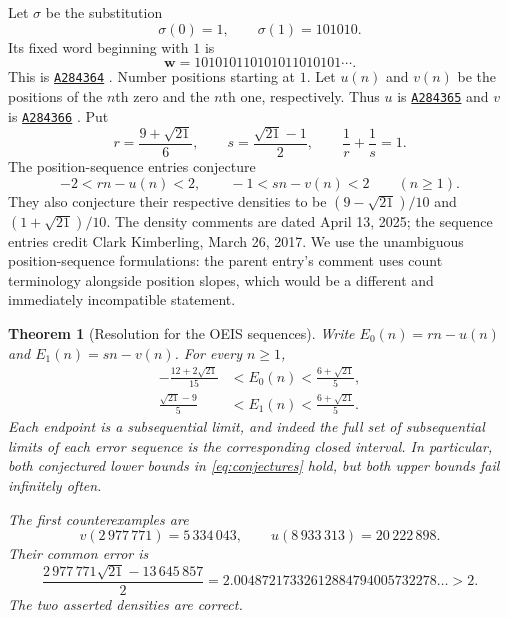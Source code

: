 \documentclass[11pt]{article}
\numberwithin{equation}{section}
\newtheorem{theorem}{Theorem}[section]
\theoremstyle{definition}
\theoremstyle{remark}
\newcommand{\word}{\mathbf{w}}
\newcommand{\OEIS}[1]{\href{https://oeis.org/#1}{\texttt{#1}}}
\begin{document}
Let $\sigma$ be the substitution
\begin{equation}\label{eq:original-sub}
\sigma(0)=1,\qquad \sigma(1)=101010.
\end{equation}
Its fixed word beginning with $1$ is
\[
\word=101010110101011010101\cdots.
\]
This is \OEIS{A284364} \cite{oeis364}. Number positions starting at $1$.
Let $u(n)$ and $v(n)$ be the positions of the $n$th zero and the $n$th one,
respectively. Thus $u$ is \OEIS{A284365} and $v$ is \OEIS{A284366}
\cite{oeis365,oeis366}. Put
\begin{equation}\label{eq:rs3}
r=\frac{9+\sqrt{21}}6,\qquad
s=\frac{\sqrt{21}-1}2,\qquad \frac1r+\frac1s=1.
\end{equation}
The position-sequence entries conjecture
\begin{equation}\label{eq:conjectures}
-2<rn-u(n)<2,\qquad -1<sn-v(n)<2\qquad(n\ge1).
\end{equation}
They also conjecture their respective densities to be
$(9-\sqrt{21})/10$ and $(1+\sqrt{21})/10$. The density comments are dated
April 13, 2025; the sequence entries credit Clark Kimberling, March 26,
2017. We use the unambiguous position-sequence formulations: the parent
entry's comment uses count terminology alongside position slopes, which
would be a different and immediately incompatible statement.

\begin{theorem}[Resolution for the OEIS sequences]\label{thm:original}
Write $E_0(n)=rn-u(n)$ and $E_1(n)=sn-v(n)$. For every $n\ge1$,
\begin{align}
-\frac{12+2\sqrt{21}}{15}&<E_0(n)<\frac{6+\sqrt{21}}5,\label{eq:zero3}\\
\frac{\sqrt{21}-9}{5}&<E_1(n)<\frac{6+\sqrt{21}}5.\label{eq:one3}
\end{align}
Each endpoint is a subsequential limit, and indeed the full set of
subsequential limits of each error sequence is the corresponding closed
interval. In particular, both conjectured lower bounds in
\eqref{eq:conjectures} hold, but both upper bounds fail infinitely often.

The first counterexamples are
\begin{equation}\label{eq:first-values}
v(2\,977\,771)=5\,334\,043,\qquad
u(8\,933\,313)=20\,222\,898.
\end{equation}
Their common error is
\begin{equation}\label{eq:common-error}
\frac{2\,977\,771\sqrt{21}-13\,645\,857}{2}
=2.00487217332612884794005732278\ldots>2.
\end{equation}
The two asserted densities are correct.
\end{theorem}
\end{document}
